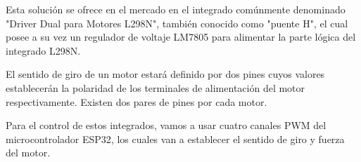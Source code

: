 Esta solución se ofrece en el mercado en el integrado comúnmente denominado "Driver Dual para Motores L298N", también conocido como "puente H", el cual posee a su vez un regulador de voltaje LM7805 para alimentar la parte lógica del integrado L298N.

El sentido de giro de un motor estará definido por dos pines cuyos valores establecerán la polaridad de los terminales de alimentación del motor respectivamente. Existen dos pares de pines por cada motor.

Para el control de estos integrados, vamos a usar cuatro canales PWM del microcontrolador ESP32, los cuales van a establecer el sentido de giro y fuerza del motor.